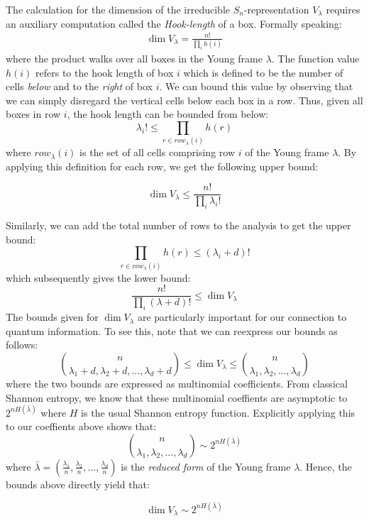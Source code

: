 \documentclass[12pt]{article}%
\begin{document}
\noindent The calculation for the dimension of the irreducible $S_n$-representation $V_\lambda$ requires an auxiliary computation called the \textit{Hook-length} of a box. Formally speaking:
\begin{gather*}
  \dim V_\lambda = \frac{n!}{\prod_{i} h(i)}
\end{gather*}
where the product walks over all boxes in the Young frame $\lambda$. The function value $h(i)$ refers to the hook length of box $i$ which is defined to be the number of cells \textit{below} and to the \textit{right} of box $i$. We can bound this value by observing that we can simply disregard the vertical cells below each box in a row. Thus, given all boxes in row $i$, the hook length can be bounded from below:
$$ \lambda_i! \leq \prod_{r \in row_\lambda(i)} h(r) $$ where $row_\lambda(i)$ is the set of all cells comprising row $i$ of the Young frame $\lambda$. By applying this definition for each row, we get the following upper bound:

\begin{equation}\label{vbound}
  \dim V_\lambda \leq \frac{n!}{\prod_i \lambda_i!}
\end{equation}

\noindent Similarly, we can add the total number of rows to the analysis to get the upper bound:
$$\prod_{r \in row_\lambda(i)} h(r) \leq (\lambda_i + d)!$$ which subsequently gives the lower bound:
$$ \frac{n!}{\prod_i (\lambda +d)!} \leq \dim V_{\lambda} $$
The bounds given for $\dim V_\lambda$ are particularly important for our connection to quantum information. To see this, note that we can reexpress our bounds as follows:
$${n \choose \lambda_1+d,\lambda_2+d,...,\lambda_d+d} \leq \dim V_{\lambda} \leq {n \choose \lambda_1,\lambda_2,...,\lambda_d} $$ where the two bounds are expressed as multinomial coefficients. From classical Shannon entropy, we know that these multinomial coeffients are asymptotic to $2^{nH(\bar{\lambda})}$ where $H$ is the usual Shannon entropy function. Explicitly applying this to our coeffients above shows that:
$$ {n \choose \lambda_1,\lambda_2,...,\lambda_d} \sim 2^{nH(\bar{\lambda})}$$
where $\bar{\lambda} = (\frac{\lambda_1}{n}, \frac{\lambda_2}{n},...,\frac{\lambda_d}{n})$ is the \textit{reduced form} of the Young frame $\lambda$. Hence, the bounds above directly yield that:

\begin{equation} \label{asymp}
  \dim V_{\lambda} \sim 2^{nH(\bar{\lambda})}
\end{equation}
\end{document}
